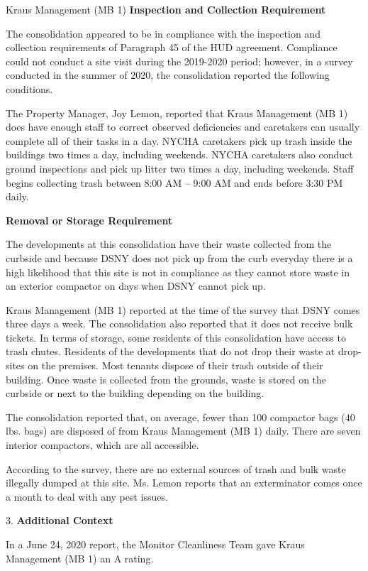 Kraus Management (MB 1)
\textbf{Inspection and Collection Requirement}

The consolidation appeared to be in compliance with the inspection and collection requirements of Paragraph 45 of the HUD agreement. Compliance could not conduct a site visit during the 2019-2020 period; however, in a survey conducted in the summer of 2020, the consolidation reported the following conditions.

The Property Manager, Joy Lemon, reported that Kraus Management (MB 1) does have enough staff to correct observed deficiencies and caretakers can usually complete all of their tasks in a day. NYCHA caretakers pick up trash inside the buildings two times a day, including weekends. NYCHA caretakers also conduct ground inspections and pick up litter two times a day, including weekends. Staff begins collecting trash between 8:00 AM -- 9:00 AM and ends before 3:30 PM daily. 

\textbf{Removal or Storage Requirement}

The developments at this consolidation have their waste collected from the curbside and because DSNY does not pick up from the curb everyday there is a high likelihood that this site is not in compliance as they cannot store waste in an exterior compactor on days when DSNY cannot pick up. 

Kraus Management (MB 1) reported at the time of the survey that DSNY comes three days a week. The consolidation also reported that it does not receive bulk tickets. In terms of storage, some residents of this consolidation have access to trash chutes. Residents of the developments that do not drop their waste at drop-sites on the premises. Most tenants dispose of their trash outside of their building. Once waste is collected from the grounds, waste is stored on the curbside or next to the building depending on the building. 

The consolidation reported that, on average, fewer than 100 compactor bags (40 lbs. bags) are disposed of from Kraus Management (MB 1) daily. There are seven interior compactors, which are all accessible. 

According to the survey, there are no external sources of trash and bulk waste illegally dumped at this site. Ms. Lemon reports that an exterminator comes once a month to deal with any pest issues. 

3. \textbf{Additional Context} 

In a June 24, 2020 report, the Monitor Cleanliness Team gave Kraus Management (MB 1)  an A rating. 